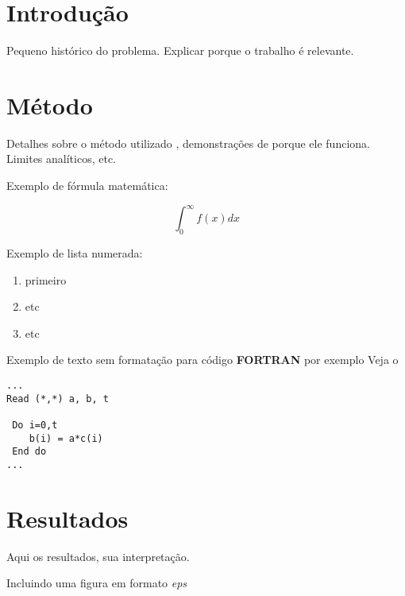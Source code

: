 \section{Introdu\c{c}\~ao} 
Pequeno histórico do problema. 
Explicar porque o trabalho é relevante.

\section{Método}
Detalhes sobre o método utilizado \cite{Kauffman_book},
demonstrações de porque ele funciona.  Limites analíticos, etc.


Exemplo de fórmula matemática:
\mbox{}

$$ \int_{0}^{\infty} f(x) dx $$

\vspace{0.5cm}

Exemplo de lista numerada:
\begin{enumerate}
  \item{ primeiro }
  \item{ etc }
  \item{ etc }
\end{enumerate}

\vspace{0.3cm}
Exemplo de texto sem formatação para código {\bf FORTRAN} por exemplo
Veja o %

\begin{verbatim}
...
Read (*,*) a, b, t

 Do i=0,t
    b(i) = a*c(i)
 End do
...

\end{verbatim}

\section{Resultados}
\vspace{2cm}
 Aqui os resultados, sua interpretação.

Incluindo uma figura em formato {\it eps}

